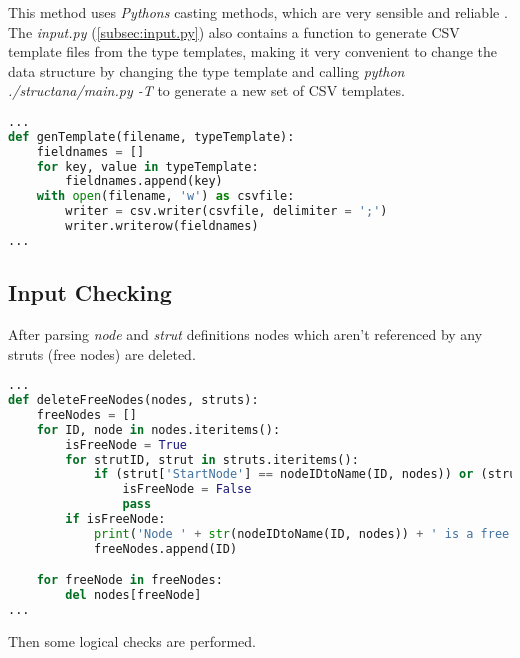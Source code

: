 This method uses \textit{Pythons} casting methods, which are very sensible and reliable \cite[2.4.1-2.4.6]{pythonTypes}.
The \textit{input.py} (\cref{subsec:input.py}) also contains a function to generate CSV template files from the type templates, making it very convenient to change the data structure by changing the type template and calling \textit{python ./structana/main.py -T} to generate a new set of CSV templates.

\begin{inconsolata}
\begin{minipage}{\linewidth}
\begin{lstlisting}[language=python]
...
def genTemplate(filename, typeTemplate):
    fieldnames = []
    for key, value in typeTemplate:
        fieldnames.append(key)
    with open(filename, 'w') as csvfile:
        writer = csv.writer(csvfile, delimiter = ';')
        writer.writerow(fieldnames)
...
\end{lstlisting}
\end{minipage}
\end{inconsolata}

\subsection{Input Checking}
\label{sec:inputcheck}

After parsing \textit{node} and \textit{strut} definitions nodes which aren't referenced by any struts (free nodes) are deleted. 

\begin{inconsolata}
\begin{minipage}{\linewidth}
\begin{lstlisting}[language=python]
...
def deleteFreeNodes(nodes, struts):
    freeNodes = []
    for ID, node in nodes.iteritems():
        isFreeNode = True
        for strutID, strut in struts.iteritems():
            if (strut['StartNode'] == nodeIDtoName(ID, nodes)) or (strut['EndNode'] == nodeIDtoName(ID, nodes)):
                isFreeNode = False
                pass
        if isFreeNode:
            print('Node ' + str(nodeIDtoName(ID, nodes)) + ' is a free node and will be deleted.')
            freeNodes.append(ID)

    for freeNode in freeNodes:
        del nodes[freeNode]
...
\end{lstlisting}
\end{minipage}
\end{inconsolata}

Then some logical checks are performed.

